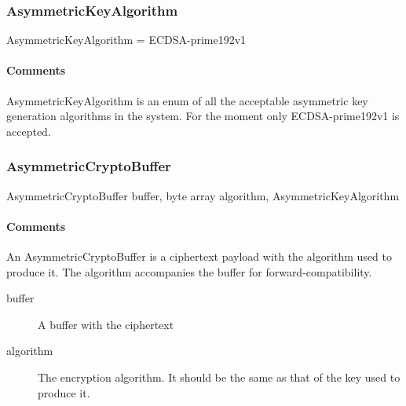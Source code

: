 \documentclass[a4paper,10pt]{article}
\begin{document}
\subsubsection{AsymmetricKeyAlgorithm}
\begin{verbbox}
AsymmetricKeyAlgorithm = { ECDSA-prime192v1 }
\end{verbbox}
\begin{center}
\theverbbox
\end{center}

\begin{inparaitem}[ ]
 \item \infrastructure
\end{inparaitem}

\paragraph*{Comments}
AsymmetricKeyAlgorithm is an enum of all the acceptable asymmetric key generation algorithms in the system. For the moment only ECDSA-prime192v1 is accepted.

\subsubsection{AsymmetricCryptoBuffer}

\begin{verbbox}
AsymmetricCryptoBuffer
{
  buffer, byte array
  algorithm, AsymmetricKeyAlgorithm
}
\end{verbbox}
\begin{center}
\theverbbox
\end{center}

\begin{inparaitem}[ ]
 \item \infrastructure
\end{inparaitem}

\paragraph*{Comments}
An AsymmetricCryptoBuffer is a ciphertext payload with the algorithm used to produce it. The algorithm accompanies the buffer for forward-compatibility.

\SpecialItem
\begin{description}
 \item[buffer] A buffer with the ciphertext
 \item[algorithm] The encryption algorithm. It should be the same as that of the key used to produce it.
\end{description}
\end{document}
